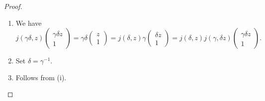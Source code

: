 \documentclass{memoir}
\begin{document}
\begin{proof}
    \begin{enumerate}
        \item We have
            \begin{equation}
            j(\gamma\delta,z) \begin{pmatrix} \gamma\delta z \\ 1\end{pmatrix} = \gamma\delta \begin{pmatrix} z \\ 1\end{pmatrix} = j(\delta,z)\gamma \begin{pmatrix} \delta z \\ 1\end{pmatrix} = j(\delta,z)j(\gamma,\delta z) \begin{pmatrix} \gamma \delta z \\ 1\end{pmatrix}.
            \end{equation}
        \item Set $\delta = \gamma^{-1}$.
        \item Follows from (i).
    \end{enumerate}
\end{proof}
\end{document}
